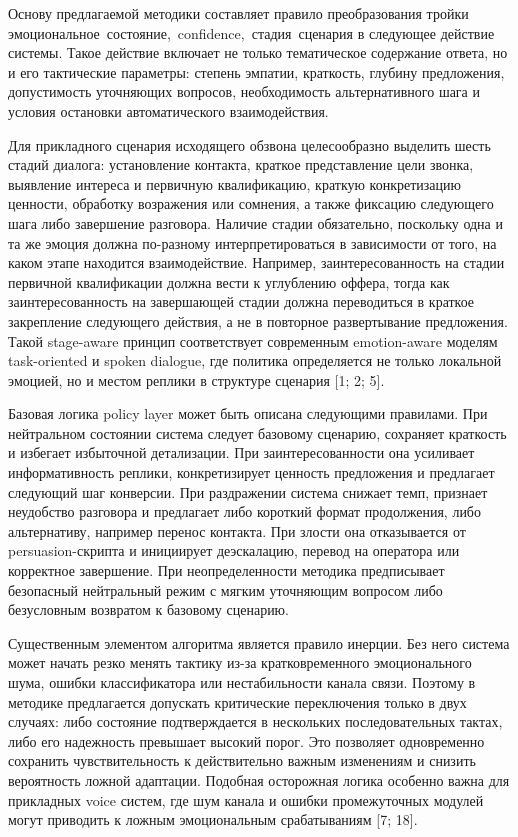 \documentclass[a4paper,14pt]{extarticle}
\renewcommand{\texttt}[1]{\textnormal{#1}}
\begin{document}
Основу предлагаемой методики составляет правило преобразования тройки
\texttt{эмоциональное\ состояние,\ confidence,\ стадия\ сценария} в
следующее действие системы. Такое действие включает не только
тематическое содержание ответа, но и его тактические параметры: степень
эмпатии, краткость, глубину предложения, допустимость уточняющих
вопросов, необходимость альтернативного шага и условия остановки
автоматического взаимодействия.

Для прикладного сценария исходящего обзвона целесообразно выделить шесть
стадий диалога: установление контакта, краткое представление цели
звонка, выявление интереса и первичную квалификацию, краткую
конкретизацию ценности, обработку возражения или сомнения, а также
фиксацию следующего шага либо завершение разговора. Наличие стадии
обязательно, поскольку одна и та же эмоция должна по-разному
интерпретироваться в зависимости от того, на каком этапе находится
взаимодействие. Например, заинтересованность на стадии первичной
квалификации должна вести к углублению оффера, тогда как
заинтересованность на завершающей стадии должна переводиться в краткое
закрепление следующего действия, а не в повторное развертывание
предложения. Такой stage-aware принцип соответствует современным
emotion-aware моделям task-oriented и spoken dialogue, где политика
определяется не только локальной эмоцией, но и местом реплики в
структуре сценария {[}1; 2; 5{]}.

Базовая логика policy layer может быть описана следующими правилами. При
нейтральном состоянии система следует базовому сценарию, сохраняет
краткость и избегает избыточной детализации. При заинтересованности она
усиливает информативность реплики, конкретизирует ценность предложения и
предлагает следующий шаг конверсии. При раздражении система снижает
темп, признает неудобство разговора и предлагает либо короткий формат
продолжения, либо альтернативу, например перенос контакта. При злости
она отказывается от persuasion-скрипта и инициирует деэскалацию, перевод
на оператора или корректное завершение. При неопределенности методика
предписывает безопасный нейтральный режим с мягким уточняющим вопросом
либо безусловным возвратом к базовому сценарию.

Существенным элементом алгоритма является правило инерции. Без него
система может начать резко менять тактику из-за кратковременного
эмоционального шума, ошибки классификатора или нестабильности канала
связи. Поэтому в методике предлагается допускать критические
переключения только в двух случаях: либо состояние подтверждается в
нескольких последовательных тактах, либо его надежность превышает
высокий порог. Это позволяет одновременно сохранить чувствительность к
действительно важным изменениям и снизить вероятность ложной адаптации.
Подобная осторожная логика особенно важна для прикладных voice систем,
где шум канала и ошибки промежуточных модулей могут приводить к ложным
эмоциональным срабатываниям {[}7; 18{]}.
\end{document}
